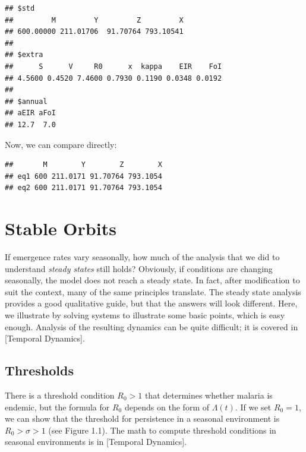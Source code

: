 \documentclass[
]{book}
\newenvironment{Shaded}{\begin{snugshade}}{\end{snugshade}}
\newcommand{\AttributeTok}[1]{\textcolor[rgb]{0.13,0.29,0.53}{#1}}
\newcommand{\FunctionTok}[1]{\textcolor[rgb]{0.13,0.29,0.53}{\textbf{#1}}}
\newcommand{\NormalTok}[1]{#1}
\newcommand{\SpecialCharTok}[1]{\textcolor[rgb]{0.81,0.36,0.00}{\textbf{#1}}}
\begin{document}
\begin{verbatim}
## $std
##         M         Y         Z         X 
## 600.00000 211.01706  91.70764 793.10541 
## 
## $extra
##      S      V     R0      x  kappa    EIR    FoI 
## 4.5600 0.4520 7.4600 0.7930 0.1190 0.0348 0.0192 
## 
## $annual
## aEIR aFoI 
## 12.7  7.0
\end{verbatim}

Now, we can compare directly:

\begin{Shaded}
\end{Shaded}

\begin{verbatim}
##       M        Y        Z        X
## eq1 600 211.0171 91.70764 793.1054
## eq2 600 211.0171 91.70764 793.1054
\end{verbatim}

\hypertarget{stable-orbits}{%
\section{Stable Orbits}\label{stable-orbits}}

If emergence rates vary seasonally, how much of the analysis that we did to understand \emph{steady states} still holds? Obviously, if conditions are changing seasonally, the model does not reach a steady state. In fact, after modification to suit the context, many of the same principles translate. The steady state analysis provides a good qualitative guide, but that the answers will look different. Here, we illustrate by solving systems to illustrate some basic points, which is easy enough. Analysis of the resulting dynamics can be quite difficult; it is covered in {[}Temporal Dynamics{]}.

\hypertarget{thresholds}{%
\subsection{Thresholds}\label{thresholds}}

There is a threshold condition \(R_0>1\) that determines whether malaria is endemic, but the formula for \(R_0\) depends on the form of \(\Lambda(t)\). If we set \(R_0=1\), we can show that the threshold for persistence in a seasonal environment is \(R_0 > \sigma > 1\) (see Figure 1.1). The math to compute threshold conditions in seasonal environments is in {[}Temporal Dynamics{]}.
\end{document}
